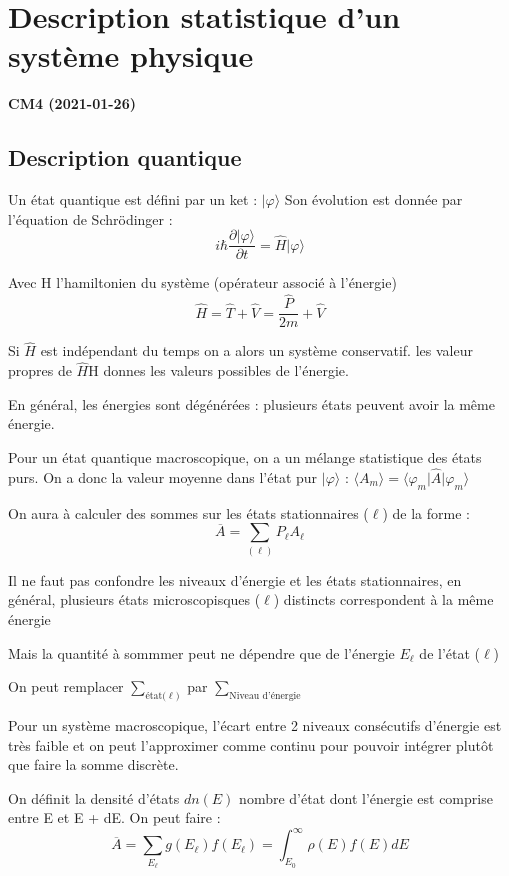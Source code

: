 \documentclass[12pt,a4paper]{report}
\begin{document}
\chapter{Description statistique d'un système physique}

\begin{center}
\textbf{CM4 (2021-01-26)}
\end{center}

\section{Description quantique}

Un état quantique est défini par un ket : \(\vert \varphi \rangle\)
Son évolution est donnée par l'équation de Schrödinger :
\[
	i\hbar \dfrac{\partial \vert \varphi \rangle}{\partial t} = \hat{H} \vert \varphi \rangle
\]

Avec H l'hamiltonien du système (opérateur associé à l'énergie)
\[
	\hat{H} = \hat{T} + \hat{V} = \dfrac{\hat{P}}{2m} + \hat{V}
\]

Si \(\hat{H}\) est indépendant du temps on a alors un système conservatif. les valeur propres de \(\hat{H}\)H donnes les valeurs possibles de l'énergie.

En général, les énergies sont dégénérées : plusieurs états peuvent avoir la même énergie.

Pour un état quantique macroscopique, on a un mélange statistique des états purs.
On a donc la valeur moyenne dans l'état pur \(\vert \varphi \rangle\) : \(\langle A_m \rangle = \langle \varphi_m \vert \hat{A} \vert \varphi_m \rangle\)

On aura à calculer des sommes sur les états stationnaires (\(\ell\)) de la forme :
\[
	\overline{A} = \sum_{(\ell)} P_{\ell} A_{\ell}
\]

Il ne faut pas confondre les niveaux d'énergie et les états stationnaires, en général, plusieurs états microscopisques (\(\ell\)) distincts correspondent à la même énergie

Mais la quantité à sommmer peut ne dépendre que de l'énergie \(E_\ell\) de l'état (\(\ell\))

On peut remplacer \(\sum_{\text{état(}\ell)}\) par \(\sum_{\text{Niveau d'énergie}}\)

Pour un système macroscopique, l'écart entre 2 niveaux consécutifs d'énergie est très faible et on peut l'approximer comme continu pour pouvoir intégrer plutôt que faire la somme discrète.

On définit la densité d'états \(dn(E)\) nombre d'état dont l'énergie est comprise entre E et E + dE.
On peut faire :
\[
	\overline{A} = \sum_{E_\ell} g(E_\ell)f(E_\ell) = \int_{E_0}^{\infty} \rho(E)f(E) dE
\]
\end{document}
